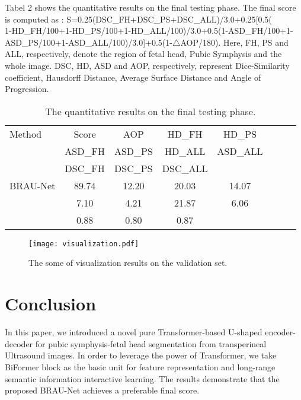 \documentclass[preprint,12pt]{elsarticle}
\begin{document}
Tabel 2 shows the quantitative results on the final testing phase.
The final score is computed as : S=0.25(DSC\_FH+DSC\_PS+DSC\_ALL)/3.0+0.25[0.5(\\1-HD\_FH/100+1-HD\_PS/100+1-HD\_ALL/100)/3.0+0.5(1-ASD\_FH/100+1-ASD\_PS/100+1-ASD\_ALL/100)/3.0]+0.5(1-$\triangle$AOP/180).
Here, FH, PS and ALL, respectively, denote the region of fetal head, Pubic Symphysis and the whole image. DSC, HD, ASD and AOP, respectively, represent Dice-Similarity coefficient, Hausdorff Distance, Average Surface Distance and Angle of Progression. 

\begin{table}[htbp]
\centering
\caption{The quantitative results on the final testing phase.}
\label{tab:my_table}
\begin{tabular}{lccccccc}
\toprule
Method & Score & AOP & HD\_FH & HD\_PS\\ & ASD\_FH & ASD\_PS & HD\_ALL & ASD\_ALL\\ & DSC\_FH & DSC\_PS & DSC\_ALL\\
\midrule
BRAU-Net & 89.74 & 12.20 & 20.03 & 14.07\\ & 7.10 & 4.21 & 21.87 & 6.06\\ & 0.88 & 0.80 & 0.87\\
\bottomrule
\end{tabular}
\end{table}
\begin{figure}
\centering
\texttt{[image: visualization.pdf]}\\
\caption{The some of visualization results on the validation set.}
\hypertarget{fig:third_image}{}
\end{figure}

\section{Conclusion}
In this paper, we introduced a novel pure Transformer-based U-shaped encoder-decoder for pubic symphysis-fetal head segmentation from transperineal Ultrasound images. In order to leverage the power of Transformer, we take BiFormer block as the basic unit for feature representation and long-range semantic information interactive learning. The results demonstrate that the proposed BRAU-Net achieves a preferable final score.
\end{document}
